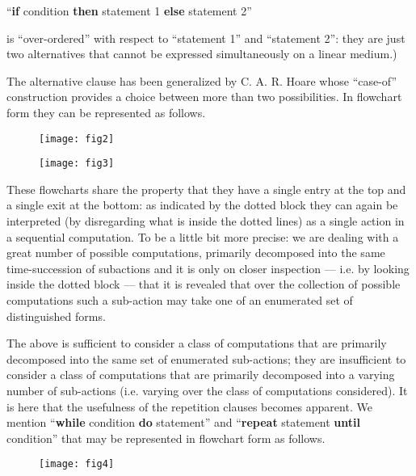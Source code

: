 {
	\setlength{\parindent}{8em}
	\hspace{-.5em}``\textbf{if} condition \textbf{then} statement 1 \textbf{else} statement 2''
}
\medskip

\noindent
is ``over-ordered'' with respect to ``statement 1'' and ``statement 2'': they are just two alternatives that cannot be expressed simultaneously on a linear medium.)

The alternative clause has been generalized by C. A. R. Hoare whose ``case-of'' construction provides a choice between more than two possibilities. In flowchart form they can be represented as follows.

\begin{figure}[ht!]
	\centering
	\texttt{[image: fig2]}
\end{figure}

\begin{figure}[ht!]
	\centering
	\texttt{[image: fig3]}
\end{figure}

These flowcharts share the property that they have a single entry at the top and a single exit at the bottom: as indicated by the dotted block they can again be interpreted (by disregarding what is inside the dotted lines) as a single action in a sequential computation. To be a little bit more precise: we are dealing with a great number of possible computations, primarily decomposed into the same time-succession of subactions and it is only on closer inspection --- i.e. by looking inside the dotted block --- that it is revealed that over the collection of possible computations such a sub-action may take one of an enumerated set of distinguished forms.

The above is sufficient to consider a class of computations that are primarily decomposed into the same set of enumerated sub-actions; they are insufficient to consider a class of computations that are primarily decomposed into a varying number of sub-actions (i.e. varying over the class of computations considered). It is here that the usefulness of the repetition clauses becomes apparent. We mention ``\textbf{while} condition \textbf{do} statement'' and ``\textbf{repeat} statement \textbf{until} condition'' that may be represented in flowchart form as follows.

\begin{figure}[ht!]
	\centering
	\texttt{[image: fig4]}
\end{figure}

